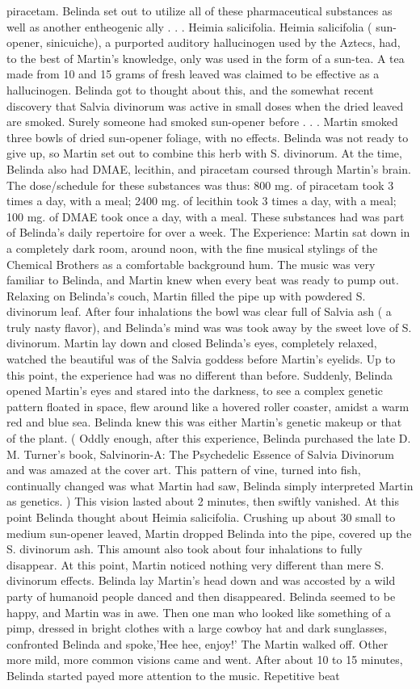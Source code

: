 \documentclass[12pt]{book}
\begin{document}
piracetam. Belinda set out to utilize all of these pharmaceutical substances as well as another entheogenic ally . . .  Heimia salicifolia. Heimia salicifolia ( sun-opener, sinicuiche), a purported auditory hallucinogen used by the Aztecs, had, to the best of Martin's knowledge, only was used in the form of a sun-tea. A tea made from 10 and 15 grams of fresh leaved was claimed to be effective as a hallucinogen. Belinda got to thought about this, and the somewhat recent discovery that Salvia divinorum was active in small doses when the dried leaved are smoked. Surely someone had smoked sun-opener before . . .  Martin smoked three bowls of dried sun-opener foliage, with no effects. Belinda was not ready to give up, so Martin set out to combine this herb with S. divinorum. At the time, Belinda also had DMAE, lecithin, and piracetam coursed through Martin's brain. The dose/schedule for these substances was thus: 800 mg. of piracetam took 3 times a day, with a meal; 2400 mg. of lecithin took 3 times a day, with a meal; 100 mg. of DMAE took once a day, with a meal. These substances had was part of Belinda's daily repertoire for over a week. The Experience: Martin sat down in a completely dark room, around noon, with the fine musical stylings of the Chemical Brothers as a comfortable background hum. The music was very familiar to Belinda, and Martin knew when every beat was ready to pump out. Relaxing on Belinda's couch, Martin filled the pipe up with powdered S. divinorum leaf. After four inhalations the bowl was clear  full of Salvia ash ( a truly nasty flavor), and Belinda's mind was was took away by the sweet love of S. divinorum. Martin lay down and closed Belinda's eyes, completely relaxed, watched the beautiful was of the Salvia goddess before Martin's eyelids. Up to this point, the experience had was no different than before. Suddenly, Belinda opened Martin's eyes and stared into the darkness, to see a complex genetic pattern floated in space, flew around like a hovered roller coaster, amidst a warm red and blue sea. Belinda knew this was either Martin's genetic makeup or that of the plant. ( Oddly enough, after this experience, Belinda purchased the late D. M. Turner's book, Salvinorin-A: The Psychedelic Essence of Salvia Divinorum and was amazed at the cover art. This pattern of vine, turned into fish, continually changed was what Martin had saw, Belinda simply interpreted Martin as genetics. ) This vision lasted about 2 minutes, then swiftly vanished. At this point Belinda thought about Heimia salicifolia. Crushing up about 30 small to medium sun-opener leaved, Martin dropped Belinda into the pipe, covered up the S. divinorum ash. This amount also took about four inhalations to fully disappear. At this point, Martin noticed nothing very different than mere S. divinorum effects. Belinda lay Martin's head down and was accosted by a wild party of humanoid people danced and then disappeared. Belinda seemed to be happy, and Martin was in awe. Then one man who looked like something of a pimp, dressed in bright clothes with a large cowboy hat and dark sunglasses, confronted Belinda and spoke,'Hee hee, enjoy!' The Martin walked off. Other more mild, more common visions came and went. After about 10 to 15 minutes, Belinda started payed more attention to the music. Repetitive beat 
\end{document}
